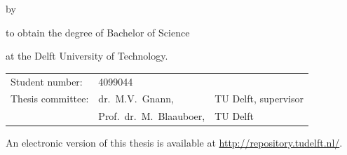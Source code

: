 \begin{titlepage}


\begin{center}


{\makeatletter
\largetitlestyle\Huge\selectfont\@title
\makeatother}

{\makeatletter
\ifx\@subtitle\undefined\else
    \bigskip
    \titlefont\titleshape\LARGE\@subtitle
\fi
\makeatother}

\bigskip
\bigskip

by

\bigskip
\bigskip

{\makeatletter
\largetitlefont\Large\selectfont\@author
\makeatother}

\bigskip
\bigskip

to obtain the degree of Bachelor of Science

at the Delft University of Technology.


\vfill

\begin{tabular}{lll}
    Student number: & 4099044 \\
    Thesis committee: & dr.\  M.V.\ Gnann, & TU Delft, supervisor \\
        & Prof.\ dr.\ M.\ Blaauboer, & TU Delft \\
\end{tabular}


\bigskip
\bigskip
An electronic version of this thesis is available at \url{http://repository.tudelft.nl/}.


\end{center}
\end{titlepage}
